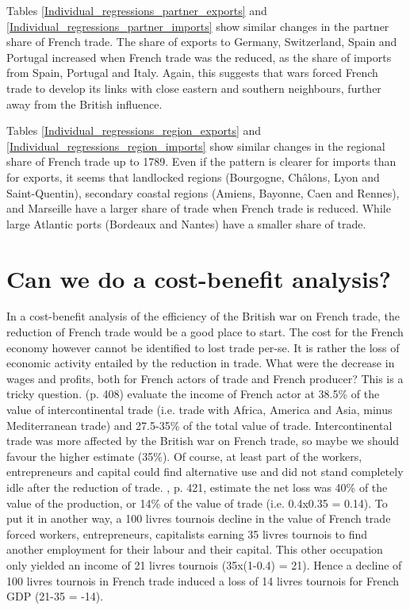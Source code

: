 \documentclass[12pt,a4paper,notitlepage,english]{article}
\begin{document}
Tables \ref{Individual_regressions_partner_exports} and \ref{Individual_regressions_partner_imports} show similar changes in the partner share of French trade.
The share of exports to Germany, Switzerland, Spain and Portugal increased when French trade was the reduced, as the share of imports from Spain, Portugal and Italy. 
Again, this suggests that wars forced French trade to develop its links with close eastern and southern neighbours, further away from the British influence.

Tables \ref{Individual_regressions_region_exports} and \ref{Individual_regressions_region_imports} show similar changes in the regional share of French trade up to 1789.
Even if the pattern is clearer for imports than for exports, it seems that landlocked regions (Bourgogne, Châlons, Lyon and Saint-Quentin), secondary coastal regions (Amiens, Bayonne, Caen and Rennes), and Marseille have a larger share of trade when French trade is reduced.
While large Atlantic ports (Bordeaux and Nantes) have a smaller share of trade.

\section{Can we do a cost-benefit analysis?}
\label{sec:cost_benefit}
In a cost-benefit analysis of the efficiency of the British war on French trade, the reduction of French trade would be a good place to start. 
The cost for the French economy however cannot be identified to lost trade per-se.
It is rather the loss of economic activity entailed by the reduction in trade.
What were the decrease in wages and profits, both for French actors of trade and French producer?
This is a tricky question.
\cite{Daudin2005} (p. 408) evaluate the income of French actor at 38.5\% of the value of intercontinental trade (i.e. trade with Africa, America and Asia, minus Mediterranean trade) and 27.5-35\% of the total value of trade.
Intercontinental trade was more affected by the British war on French trade, so maybe we should favour the higher estimate (35\%).
Of course, at least part of the workers, entrepreneurs and capital could find alternative use and did not stand completely idle after the reduction of trade. 
\cite{Daudin2005}, p. 421, estimate the net loss was 40\% of the value of the production, or 14\% of the value of trade (i.e. 0.4x0.35 = 0.14). 
To put it in another way, a 100 livres tournois decline in the value of French trade forced workers, entrepreneurs, capitalists earning 35 livres tournois to find another employment for their labour and their capital. This other occupation only yielded an income of 21 livres tournois (35x(1-0.4) = 21).
Hence a decline of 100 livres tournois in French trade induced a loss of 14 livres tournois for French GDP (21-35 = -14). 
\end{document}
